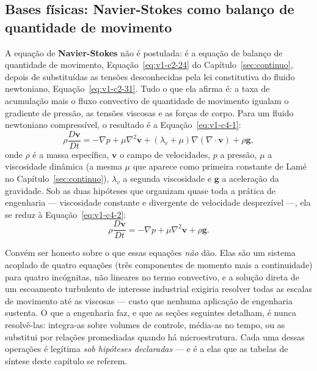 \documentclass[12pt,a4paper]{article}
\numberwithin{equation}{section}
\numberwithin{table}{section}
\numberwithin{figure}{section}
\begin{document}
\subsection{Bases físicas: Navier-Stokes como balanço de quantidade de
movimento}\label{sub:v1-c4-bases}

A equação de \textbf{Navier-Stokes} não é postulada: é a equação de balanço de
quantidade de movimento, Equação~\eqref{eq:v1-c2-24} do
Capítulo~\ref{sec:continuo}, depois de substituídas as tensões desconhecidas
pela lei constitutiva do fluido newtoniano, Equação~\eqref{eq:v1-c2-31}. Tudo
o que ela afirma é: a taxa de acumulação mais o fluxo convectivo de quantidade
de movimento igualam o gradiente de pressão, as tensões viscosas e as forças
de corpo. Para um fluido newtoniano compressível, o resultado é a
Equação~\eqref{eq:v1-c4-1}:
\begin{equation}\label{eq:v1-c4-1}
\rho\frac{D\mathbf{v}}{Dt} = -\nabla p + \mu\nabla^2\mathbf{v} +
\left(\lambda_v + \mu\right)\nabla\left(\nabla\cdot\mathbf{v}\right) + \rho\mathbf{g},
\end{equation}
onde $\rho$ é a massa específica, $\mathbf{v}$ o campo de velocidades, $p$ a
pressão, $\mu$ a viscosidade dinâmica (a mesma $\mu$ que aparece como primeira
constante de Lamé no Capítulo~\ref{sec:continuo}), $\lambda_v$ a segunda
viscosidade e $\mathbf{g}$ a aceleração da gravidade. Sob as duas hipóteses
que organizam quase toda a prática de engenharia --- viscosidade constante e
divergente de velocidade desprezível ---, ela se reduz à
Equação~\eqref{eq:v1-c4-2}:
\begin{equation}\label{eq:v1-c4-2}
\rho\frac{D\mathbf{v}}{Dt} = -\nabla p + \mu\nabla^2\mathbf{v} + \rho\mathbf{g}.
\end{equation}

Convém ser honesto sobre o que essas equações \emph{não} dão. Elas são um
sistema acoplado de quatro equações (três componentes de momento mais a
continuidade) para quatro incógnitas, não lineares no termo convectivo, e a
solução direta de um escoamento turbulento de interesse industrial exigiria
resolver todas as escalas de movimento até as viscosas --- custo que nenhuma
aplicação de engenharia sustenta. O que a engenharia faz, e que as seções
seguintes detalham, é nunca resolvê-las: integra-as sobre volumes de controle,
média-as no tempo, ou as substitui por relações promediadas quando há
microestrutura. Cada uma dessas operações é legítima \emph{sob hipóteses
declaradas} --- e é a elas que as tabelas de síntese deste capítulo se referem.
\end{document}
